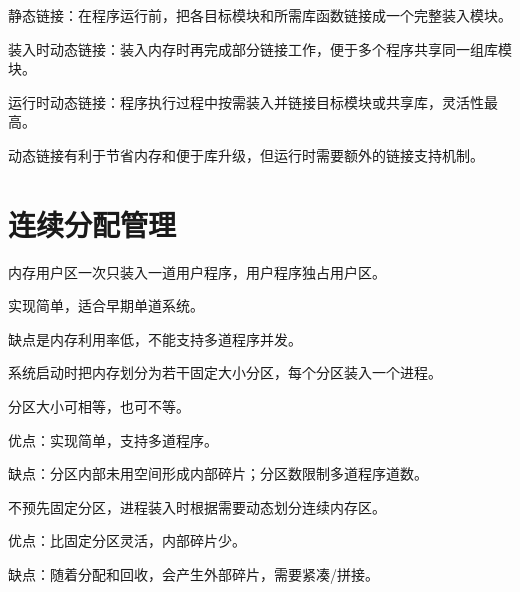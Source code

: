 \begin{points}
  \item 静态链接：在程序运行前，把各目标模块和所需库函数链接成一个完整装入模块。
  \item 装入时动态链接：装入内存时再完成部分链接工作，便于多个程序共享同一组库模块。
  \item 运行时动态链接：程序执行过程中按需装入并链接目标模块或共享库，灵活性最高。
  \item 动态链接有利于节省内存和便于库升级，但运行时需要额外的链接支持机制。
\end{points}


\section{连续分配管理}
\begin{points}
  \item 内存用户区一次只装入一道用户程序，用户程序独占用户区。
  \item 实现简单，适合早期单道系统。
  \item 缺点是内存利用率低，不能支持多道程序并发。
\end{points}


\begin{points}
  \item 系统启动时把内存划分为若干固定大小分区，每个分区装入一个进程。
  \item 分区大小可相等，也可不等。
  \item 优点：实现简单，支持多道程序。
  \item 缺点：分区内部未用空间形成内部碎片；分区数限制多道程序道数。
\end{points}


\begin{points}
  \item 不预先固定分区，进程装入时根据需要动态划分连续内存区。
  \item 优点：比固定分区灵活，内部碎片少。
  \item 缺点：随着分配和回收，会产生外部碎片，需要紧凑/拼接。
\end{points}


